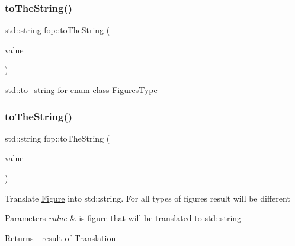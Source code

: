 \subsubsection{\texorpdfstring{to\+The\+String()}{toTheString()}\hspace{0.1cm}{\footnotesize\ttfamily [1/2]}}
{\footnotesize\ttfamily std\+::string fop\+::to\+The\+String (\begin{DoxyParamCaption}\item[{\mbox{\hyperlink{namespacefop_a60dafe2e1ac5bb402dad57ecacde23d5}{Figures\+Type}}}]{value }\end{DoxyParamCaption})}

std\+::to\+\_\+string for enum class Figures\+Type \mbox{\label{namespacefop_a6e88eff251cad9a76ad0c171c60ee230}} 
\subsubsection{\texorpdfstring{to\+The\+String()}{toTheString()}\hspace{0.1cm}{\footnotesize\ttfamily [2/2]}}
{\footnotesize\ttfamily std\+::string fop\+::to\+The\+String (\begin{DoxyParamCaption}\item[{const \mbox{\hyperlink{classfop_1_1_figure}{Figure}} \&}]{value }\end{DoxyParamCaption})}

Translate \mbox{\hyperlink{classfop_1_1_figure}{Figure}} into std\+::string. For all types of figures result will be different


\begin{DoxyParams}{Parameters}
{\em value} & is figure that will be translated to std\+::string \\
\hline
\end{DoxyParams}
\begin{DoxyReturn}{Returns}
-\/ result of Translation 
\end{DoxyReturn}
